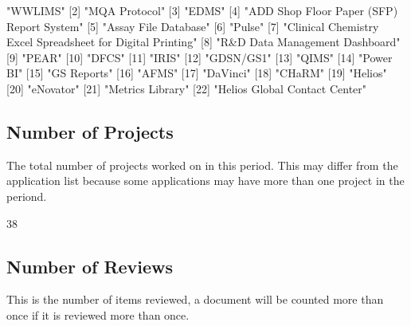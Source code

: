 \documentclass{article}
\begin{document}
\begin{Schunk}
\begin{Soutput}
 [1] "WWLIMS"                                                   
 [2] "MQA Protocol"                                             
 [3] "EDMS"                                                     
 [4] "ADD Shop Floor Paper (SFP) Report System"                 
 [5] "Assay File Database"                                      
 [6] "Pulse"                                                    
 [7] "Clinical Chemistry Excel Spreadsheet for Digital Printing"
 [8] "R&D Data Management Dashboard"                            
 [9] "PEAR"                                                     
[10] "DFCS"                                                     
[11] "IRIS"                                                     
[12] "GDSN/GS1"                                                 
[13] "QIMS"                                                     
[14] "Power BI"                                                 
[15] "GS Reports"                                               
[16] "AFMS"                                                     
[17] "DaVinci"                                                  
[18] "CHaRM"                                                    
[19] "Helios"                                                   
[20] "eNovator"                                                 
[21] "Metrics Library"                                          
[22] "Helios Global Contact Center"                             
\end{Soutput}
\end{Schunk}

\subsection{Number of Projects}
The total number of  projects worked on in this period. This may differ from the
application list because some applications may have more than one project in
the periond.

\begin{Schunk}
\begin{Soutput}
[1] 38
\end{Soutput}
\end{Schunk}

\subsection{Number of Reviews}
This is the number of items reviewed, a document will be counted more than once
if it is reviewed more than once.
\end{document}
